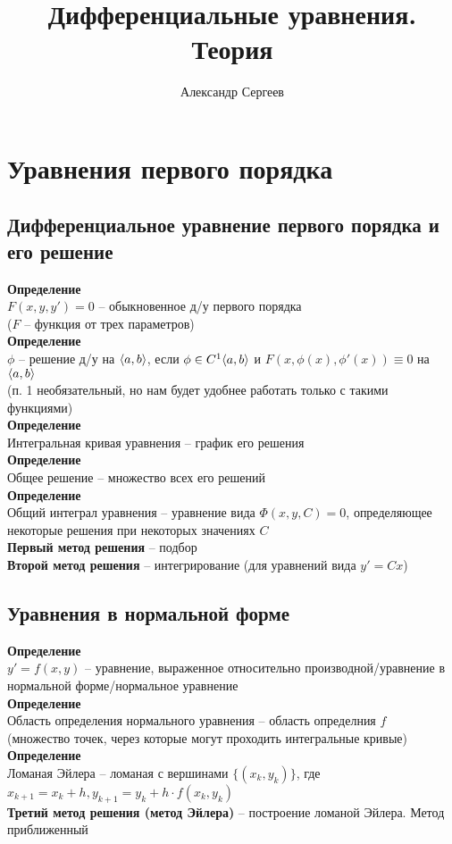 \documentclass[12pt]{article}
\title{Дифференциальные уравнения. Теория}
\author{Александр Сергеев}
\date{}
\begin{document}
\maketitle
\section{Уравнения первого порядка}
\subsection{Дифференциальное уравнение первого порядка и его решение}
\textbf{Определение}\\
$F(x, y, y') = 0$ -- обыкновенное д/у первого порядка\\
($F$ -- функция от трех параметров)\\
\textbf{Определение}\\
$\phi$ -- решение д/у на $\langle a, b \rangle$, если $\phi \in C^1\langle a, b \rangle$ и $F(x, \phi(x), \phi'(x)) \equiv 0$ на $\langle a, b \rangle$\\
(п. 1 необязательный, но нам будет удобнее работать только с такими функциями)\\
\textbf{Определение}\\
Интегральная кривая уравнения -- график его решения\\
\textbf{Определение}\\
Общее решение -- множество всех его решений\\
\textbf{Определение}\\
Общий интеграл уравнения -- уравнение вида $\Phi(x, y, C) = 0$, определяющее некоторые решения при некоторых значениях $C$\\
\textbf{Первый метод решения} -- подбор\\
\textbf{Второй метод решения} -- интегрирование (для уравнений вида $y'=Cx$)
\subsection{Уравнения в нормальной форме}
\textbf{Определение}\\
$y' = f(x, y)$ -- уравнение, выраженное относительно производной/уравнение в нормальной форме/нормальное уравнение\\
\textbf{Определение}\\
Область определения нормального уравнения -- область определния $f$\\
(множество точек, через которые могут проходить интегральные кривые)\\
\textbf{Определение}\\
Ломаная Эйлера -- ломаная с вершинами $\{(x_k, y_k)\}$, где $x_{k+1} = x_k + h, y_{k+1}=y_k+h\cdot f(x_k, y_k)$\\
\textbf{Третий метод решения (метод Эйлера)} -- построение ломаной Эйлера. Метод приближенный
\end{document}
